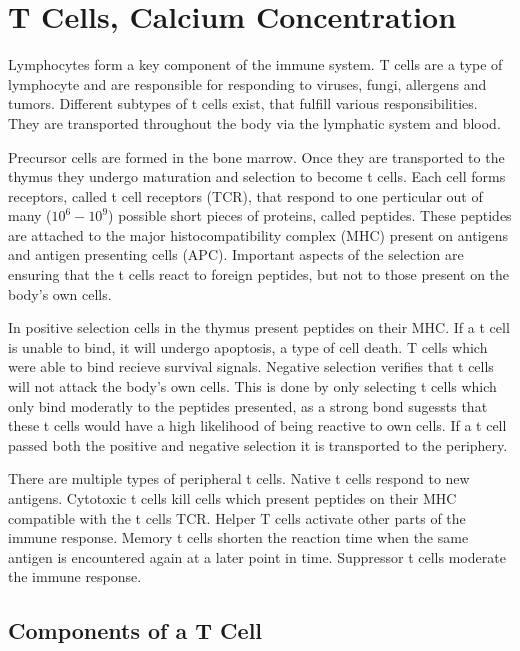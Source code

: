 \chapter{T Cells, Calcium Concentration}
\label{chapter:t-cell}

Lymphocytes form a key component of the immune system. T cells are a type of lymphocyte and are responsible for responding to viruses, fungi, allergens and tumors. Different subtypes of t cells exist, that fulfill various responsibilities. They are transported throughout the body via the lymphatic system and blood.\cite{Kumar2018}

Precursor cells are formed in the bone marrow. Once they are transported to the thymus they undergo maturation and selection to become t cells. Each cell forms receptors, called t cell receptors (TCR), that respond to one perticular out of many ($10^6 - 10^9$) possible short pieces of proteins, called peptides. These peptides are attached to the major histocompatibility complex (MHC) present on antigens and antigen presenting cells (APC). Important aspects of the selection are ensuring that the t cells react to foreign peptides, but not to those present on the body's own cells.\cite{Ashby2024}

In positive selection cells in the thymus present peptides on their MHC. If a t cell is unable to bind, it will undergo apoptosis, a type of cell death. T cells which were able to bind recieve survival signals. Negative selection verifies that t cells will not attack the body's own cells. This is done by only selecting t cells which only bind moderatly to the peptides presented, as a strong bond sugessts that these t cells would have a high likelihood of being reactive to own cells.\cite{Hagel2018} If a t cell passed both the positive and negative selection it is transported to the periphery.

There are multiple types of peripheral t cells. Native t cells respond to new antigens. Cytotoxic t cells kill cells which present peptides on their MHC compatible with the t cells TCR. Helper T cells activate other parts of the immune response. Memory t cells shorten the reaction time when the same antigen is encountered again at a later point in time. Suppressor t cells moderate the immune response.\cite{Ganong1997}

\section{Components of a T Cell}

